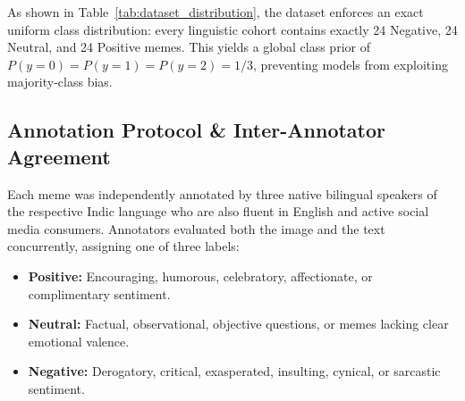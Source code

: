 \documentclass[10pt,journal,compsoc]{IEEEtran}
\begin{document}
\begin{table}[t]
\centering
\caption{Distribution of Dataset across Linguistic Cohorts and Sentiment Polarities}
\label{tab:dataset_distribution}
\end{table}

As shown in Table~\ref{tab:dataset_distribution}, the dataset enforces an exact uniform class distribution: every linguistic cohort contains exactly 24 Negative, 24 Neutral, and 24 Positive memes. This yields a global class prior of $P(y=0) = P(y=1) = P(y=2) = 1/3$, preventing models from exploiting majority-class bias.

\subsection{Annotation Protocol \& Inter-Annotator Agreement}
Each meme was independently annotated by three native bilingual speakers of the respective Indic language who are also fluent in English and active social media consumers. Annotators evaluated both the image and the text concurrently, assigning one of three labels:
\begin{itemize}
    \item \textbf{Positive:} Encouraging, humorous, celebratory, affectionate, or complimentary sentiment.
    \item \textbf{Neutral:} Factual, observational, objective questions, or memes lacking clear emotional valence.
    \item \textbf{Negative:} Derogatory, critical, exasperated, insulting, cynical, or sarcastic sentiment.
\end{itemize}
\end{document}
